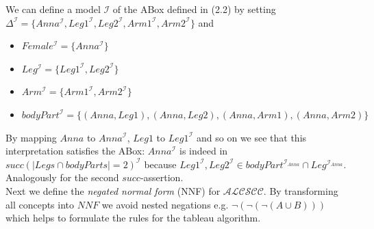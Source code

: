 \documentclass{book}
\theoremstyle{break}
\theoremstyle{definition}
\begin{document}
We can define a model $\mathcal{I}$ of the ABox defined in (2.2) by setting $\Delta^\mathcal{I}=\{Anna^\mathcal{I}, Leg1^\mathcal{I}, Leg2^\mathcal{I}, Arm1^\mathcal{I}, Arm2^\mathcal{I}\}$ and 
\begin{itemize}
\item $Female^\mathcal{I}=\{Anna^\mathcal{I}\}$
\item $Leg^\mathcal{I}=\{Leg1^\mathcal{I}, Leg2^\mathcal{I}\}$
\item $Arm^\mathcal{I}=\{Arm1^\mathcal{I}, Arm2^\mathcal{I}\}$
\item $bodyPart^\mathcal{I}=\{(Anna,Leg1),(Anna,Leg2), (Anna,Arm1), (Anna,Arm2)\}$
\end{itemize}
By mapping $Anna$ to $Anna^\mathcal{I}$, $Leg1$ to $Leg1^\mathcal{I}$ and so on we see that this interpretation satisfies the ABox: $Anna^\mathcal{I}$ is indeed in $succ(|Legs\cap bodyParts|=2)^\mathcal{I}$ because $Leg1^\mathcal{I},Leg2^\mathcal{I}\in bodyPart^{\mathcal{I}_{Anna}}\cap Leg^{\mathcal{I}_{Anna}}$. Analogously for the second $succ$-assertion.\\
Next we define the \textit{negated normal form} (NNF) for $\mathcal{ALCSCC}$. By transforming all concepts into $NNF$ we avoid nested negations e.g. $\neg(\neg(\neg(A\cup B)))$ which helps to formulate the rules for the tableau algorithm.
\end{document}
